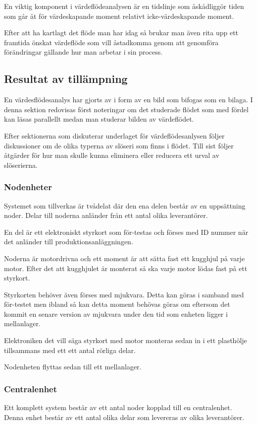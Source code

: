 \documentclass{article}
\begin{document}
En viktig komponent i värdeflödeanalysen är en tidslinje som åskådliggör tiden som går åt för värdeskapande moment relativt icke-värdeskapande moment.

Efter att ha kartlagt det flöde man har idag så brukar man även rita upp ett framtida önskat värdeflöde som vill åstadkomma genom att genomföra förändringar gällande hur man arbetar i sin process.

\subsection*{Resultat av tillämpning}
En värdesflödesanalys har gjorts av i form av en bild som bifogas som en bilaga. I denna sektion redovisas först noteringar om det studerade flödet som med fördel kan läsas parallellt medan man studerar bilden av värdeflödet.

Efter sektionerna som diskuterar underlaget för värdeflödesanlysen följer diskussioner om de olika typerna av slöseri som finns i flödet. Till sist följer åtgärder för hur man skulle kunna eliminera eller reducera ett urval av slöserierna.

\subsubsection*{Nodenheter}
Systemet som tillverkas är tvådelat där den ena delen består av en uppsättning noder. Delar till noderna anländer från ett antal olika leverantörer.

En del är ett elektroniskt styrkort som för-testas och förses med ID nummer när det anländer till produktionsanläggningen.

Noderna är motordrivna och ett moment är att sätta fast ett kugghjul på varje motor. Efter det att kugghjulet är monterat så ska varje motor lödas fast på ett styrkort.

Styrkorten behöver även förses med mjukvara. Detta kan göras i samband med för-testet men ibland så kan detta moment behövas göras om eftersom det kommit en senare version av mjukvara under den tid som enheten ligger i mellanlager.

Elektroniken det vill säga styrkort med motor monteras sedan in i ett plasthölje tillsammans med ett ett antal rörliga delar.

Nodenheten flyttas sedan till ett mellanlager.
  
\subsubsection*{Centralenhet}
Ett komplett system består av ett antal noder kopplad till en centralenhet. Denna enhet består av ett antal olika delar som levereras av olika leverantörer. 
\end{document}
